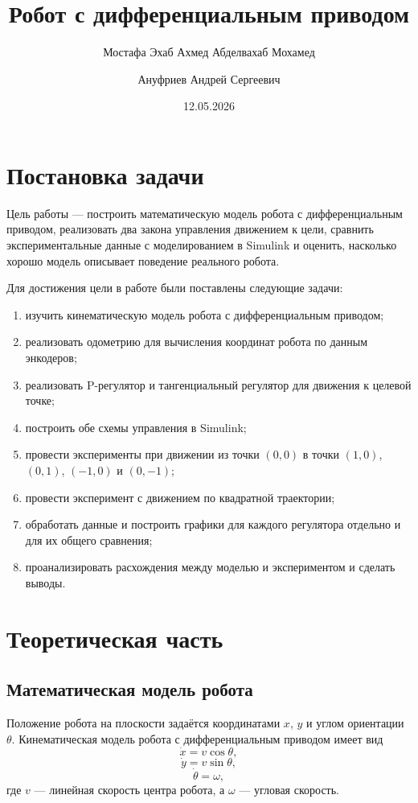 \documentclass[a4paper, 12pt]{article}
\title{
Робот с дифференциальным приводом
}
\author{Мостафа Эхаб Ахмед Абделвахаб Мохамед}
\affil{503341}
\author{Ануфриев Андрей Сергеевич}
\affil{465029}
\date{12.05.2026}
\begin{document}
\maketitle

\section{Постановка задачи}

Цель работы --- построить математическую модель робота с дифференциальным приводом, реализовать два закона управления движением к цели, сравнить экспериментальные данные с моделированием в Simulink и оценить, насколько хорошо модель описывает поведение реального робота.

Для достижения цели в работе были поставлены следующие задачи:
\begin{enumerate}
\item изучить кинематическую модель робота с дифференциальным приводом;
\item реализовать одометрию для вычисления координат робота по данным энкодеров;
\item реализовать P-регулятор и тангенциальный регулятор для движения к целевой точке;
\item построить обе схемы управления в Simulink;
\item провести эксперименты при движении из точки $(0,0)$ в точки $(1,0)$, $(0,1)$, $(-1,0)$ и $(0,-1)$;
\item провести эксперимент с движением по квадратной траектории;
\item обработать данные и построить графики для каждого регулятора отдельно и для их общего сравнения;
\item проанализировать расхождения между моделью и экспериментом и сделать выводы.
\end{enumerate}

\section{Теоретическая часть}

\subsection{Математическая модель робота}

Положение робота на плоскости задаётся координатами $x$, $y$ и углом ориентации $\theta$. Кинематическая модель робота с дифференциальным приводом имеет вид
\begin{equation}
\dot{x} = v\cos\theta,
\end{equation}
\begin{equation}
\dot{y} = v\sin\theta,
\end{equation}
\begin{equation}
\dot{\theta} = \omega,
\end{equation}
где $v$ --- линейная скорость центра робота, а $\omega$ --- угловая скорость.
\end{document}
